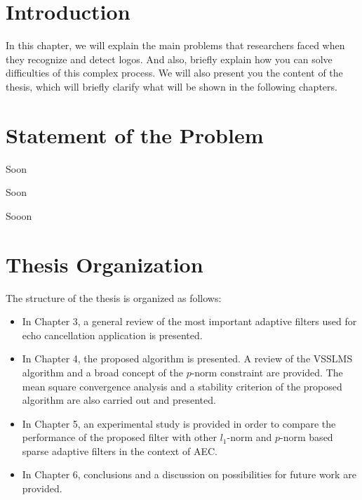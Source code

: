 \section{Introduction}\label{sec:2.1}
\vspace{-0.5cm}
\noindent In this chapter, we will explain the main problems that researchers faced when they recognize and detect logos. And also, briefly explain how you can solve difficulties of this complex process. We will also present you the content of the thesis, which will briefly clarify what will be shown in the following chapters.


\vspace{-0.3cm}


\section{Statement of the Problem}\label{sec:2.2}
\vspace{-0.5cm}
\noindent Soon

\vspace{-0.5cm}
\par
\noindent Soon

\vspace{-0.5cm}
\par
\noindent Sooon 


\vspace{-0.3cm}
\section{Thesis Organization}\label{sec:2.3}
\vspace{-0.5cm}
\noindent The structure of the thesis is organized as follows:

\vspace{-0.8cm}
\begin{itemize}
  \item  In Chapter 3, a general review of the most important adaptive filters used for echo cancellation application is presented. %
\vspace{-0.3cm}
  \item In Chapter 4, the proposed algorithm is presented. A review of the VSSLMS algorithm and a broad concept of the $p$-norm constraint are provided. The mean square convergence analysis and a stability criterion of the proposed algorithm are also carried out and presented.
\vspace{-0.3cm}
  \item In Chapter 5, an experimental study is provided in order to compare the performance of the proposed filter with other $l_1$-norm and $p$-norm based sparse adaptive filters  in the context of AEC.
\vspace{-0.3cm}
  \item In Chapter 6, conclusions and a discussion on possibilities for future work are provided.
\end{itemize}

\vspace{-0.5cm}
